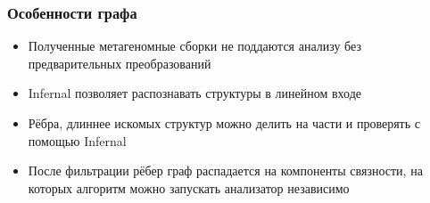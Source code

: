 \documentclass{beamer}
\begin{document}

\begin{frame}
    \frametitle{Особенности графа}
    \begin{itemize}
        \item Полученные метагеномные сборки не поддаются анализу без предварительных преобразований
        \item Infernal позволяет распознавать структуры в линейном входе
        \item Рёбра, длиннее искомых структур можно делить на части и проверять с помощью Infernal
        \item После фильтрации рёбер граф распадается на компоненты связности, на которых алгоритм можно запускать анализатор независимо
    \end{itemize}
\end{frame}
\end{document}
